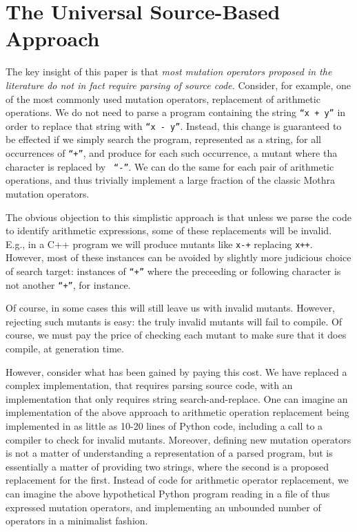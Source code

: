 \documentclass[sigconf,review, anonymous]{acmart}
\begin{document}
\section{The Universal Source-Based Approach}

The key insight of this paper is that \emph{most mutation operators
  proposed in the literature do not in fact require parsing of source
  code.}  Consider, for example, one of the most commonly used
mutation operators, replacement of arithmetic operations.  We do not
need to parse a program containing the string {\tt ``x + y''} in order to
replace that string with {\tt ``x - y''}.  Instead, this change is
guaranteed to be effected if we simply search the program, represented
as a string, for all occurrences of  {\tt ``+''}, and produce for each
such occurrence, a mutant where tha character is replaced by {\tt
  ``-''}.  We can do the same for each pair of arithmetic operations,
and thus trivially implement a large fraction of the classic Mothra~\cite{offutt1996experimental}
mutation operators.

The obvious objection to this simplistic approach is that unless we
parse the code to identify arithmetic expressions, some of these
replacements will be invalid.  E.g., in a C++ program we will produce
mutants like {\tt x-+} replacing {\tt x++}.  However, most of these
instances can be avoided by slightly more judicious choice of search
target: instances of {\tt ``+''} where the preceeding or following
character is not another {\tt ``+''}, for instance.

Of course, in some cases this will still leave us with invalid
mutants.  However, rejecting such mutants is easy: the truly invalid
mutants will fail to compile.  Of course, we must pay the price of
checking each mutant to make sure that it does compile, at generation
time.

However, consider what has been gained by paying this cost.  We have
replaced a complex implementation, that requires parsing source code,
with an implementation that only requires string search-and-replace.
One can imagine an implementation of the above approach to arithmetic
operation replacement being implemented in as little as 10-20 lines of
Python code, including a call to a compiler to check for invalid
mutants.  Moreover, defining new mutation operators is not a matter of
understanding a representation of a parsed program, but is essentially
a matter of providing two strings, where the second is a proposed
replacement for the first.  Instead of code for arithmetic operator
replacement, we can imagine the above hypothetical Python program
reading in a file of thus expressed mutation operators, and
implementing an unbounded number of operators in a minimalist fashion.
\end{document}
